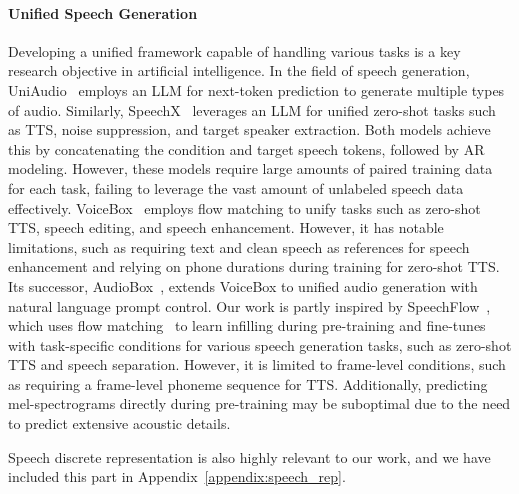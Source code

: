 \paragraph{Unified Speech Generation} Developing a unified framework capable of handling various tasks is a key research objective in artificial intelligence. In the field of speech generation, UniAudio~\cite{yang2023uniaudio} employs an LLM for next-token prediction to generate multiple types of audio. Similarly, SpeechX~\cite{wang2024speechx} leverages an LLM for unified zero-shot tasks such as TTS, noise suppression, and target speaker extraction. Both models achieve this by concatenating the condition and target speech tokens, followed by AR modeling.
However, these models require large amounts of paired training data for each task, failing to leverage the vast amount of unlabeled speech data effectively. VoiceBox~\cite{le2024voicebox} employs flow matching to unify tasks such as zero-shot TTS, speech editing, and speech enhancement. However, it has notable limitations, such as requiring text and clean speech as references for speech enhancement and relying on phone durations during training for zero-shot TTS. Its successor, AudioBox~\cite{vyas2023audiobox}, extends VoiceBox to unified audio generation with natural language prompt control. Our work is partly inspired by SpeechFlow~\cite{liu2023generative}, which uses flow matching~\cite{lipman2022flow} to learn infilling during pre-training and fine-tunes with task-specific conditions for various speech generation tasks, such as zero-shot TTS and speech separation. However, it is limited to frame-level conditions, such as requiring a frame-level phoneme sequence for TTS. Additionally, predicting mel-spectrograms directly during pre-training may be suboptimal due to the need to predict extensive acoustic details.

Speech discrete representation is also highly relevant to our work, and we have included this part in Appendix~\ref{appendix:speech_rep}.